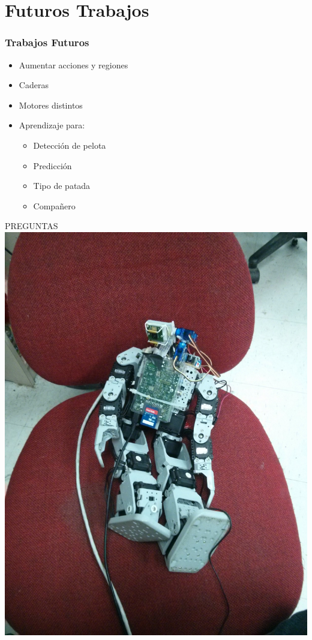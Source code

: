\documentclass{beamer}
\begin{document}
\section{Futuros Trabajos}
\begin{frame}
\frametitle{Trabajos Futuros }
\begin{block}{}
\begin{itemize}
\item Aumentar acciones y regiones
\item Caderas
\item Motores distintos
\item Aprendizaje para:
\begin{itemize}
	\item Detecci\'on de pelota
	\item Predicci\'on 
	\item Tipo de patada
	\item Compa\~nero
\end{itemize}
\end{itemize}
\end{block}
\end{frame}
\begin{frame}

\LARGE{PREGUNTAS}
\includegraphics[scale=0.05]{tirolesa}
\end{frame}
\end{document}
